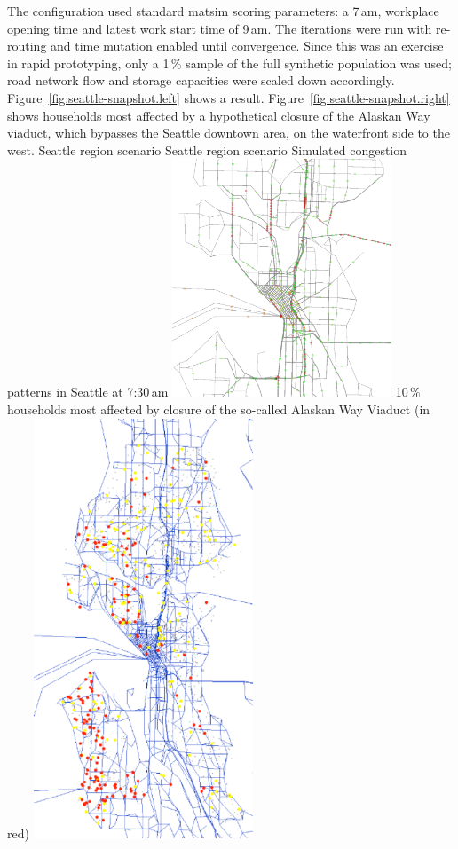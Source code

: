 The configuration used standard \gls{matsim} scoring parameters: a 7\,am, workplace opening time and latest work start time of 9\,am. The iterations were run with re-routing and time mutation enabled until convergence. Since this was an exercise in rapid prototyping, only a 1\,\% sample of the full synthetic population was used; road network flow and storage capacities were scaled down accordingly. Figure~\ref{fig:seattle-snapshot.left} shows a result. Figure~\ref{fig:seattle-snapshot.right} shows households most affected by a hypothetical closure of the Alaskan Way viaduct, which bypasses the Seattle downtown area, on the waterfront side to the west.
%
\createfigure%
{Seattle region scenario}%
{Seattle region scenario}%
{\label{fig:seattle-snapshot}}%
{%
  \createsubfigure%
  {Simulated congestion patterns in Seattle at 7:30\,am}%
  {\includegraphics[width=0.49\textwidth,angle=0]{using/figures/seattle-snapshot-7h30.pdf}}%
  {\label{fig:seattle-snapshot.left}}%
  {}%
  \createsubfigure%
  {10\,\% households most affected by closure of the so-called Alaskan Way Viaduct (in red)}%
	{\includegraphics[width=0.49\textwidth,angle=0]{using/figures/seattle-top-10pct-0it.pdf}}%
  {\label{fig:seattle-snapshot.right}}%
  {}%
}%
{}



